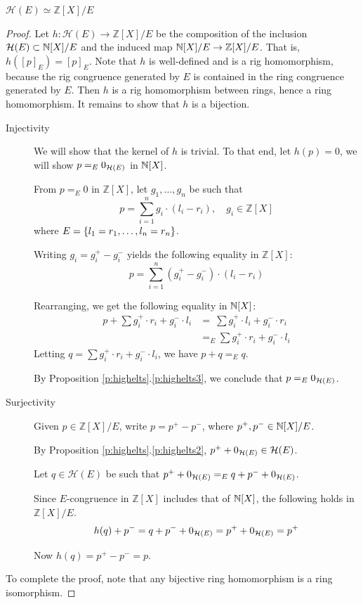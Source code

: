 \documentclass[numbers=enddot]{scrartcl}
\newcommand{\ints}{\mathbb{Z}}
\newcommand{\highring}{\mathcal{H}(E)}
\begin{document}
\begin{thm}
  $\highring \simeq \ints[X]/E$
\end{thm}
\begin{proof}
  Let $h : \highring \to \ints[X]/E$ be the composition of the inclusion $\highring \subset \nat[X]/E$ 
  and the induced map $\nat[X]/E \to \ints[X]/E$. That is, $h([p]_E) = [p]_E$. 
  Note that $h$ is well-defined and is a rig homomorphism, because the rig congruence generated by $E$ is contained in the ring congruence generated by $E$.
  Then $h$ is a rig homomorphism between rings, 
  hence a ring homomorphism. It remains to show that $h$ is a bijection.
  \begin{description}
    \item[Injectivity]
      We will show that the kernel of $h$ is trivial. To that end, let $h(p) = 0$, we will show 
      $p =_E \highzero$ in $\mathbb{N}[X]$.

      From $p =_E 0$ in $\ints[X]$, let $g_1,\dots,g_n$ be such that 
      \[ p = \sum_{i = 1}^n g_i \cdot (l_i - r_i), \quad g_i \in \ints[X] \] 
      where $E = \left\{l_1=r_1,\dots,l_n=r_n\right\}$.  

      Writing $g_i = g_i^+ - g_i^-$ yields the following equality in $\ints[X]$:
      \[ p = \sum_{i=1}^n (g_i^+-g_i^-)\cdot(l_i - r_i)\]

      Rearranging, we get the following equality in $\mathbb{N}[X]$:
      \begin{align*}
      p + \sum g_i^+ \cdot r_i + g_i^- \cdot l_i  
      &=\ \sum g_i^+ \cdot l_i + g_i^- \cdot r_i \\
      &=_E \sum g_i^+ \cdot r_i + g_i^- \cdot l_i
    \end{align*}
    Letting $q = \sum g_i^+ \cdot r_i + g_i^- \cdot l_i$, we have 
    $p + q =_E q$.

    By Proposition \ref{p:highelts}.\ref{p:highelts3}, we conclude that $p =_E \highzero$.
    \item[Surjectivity]
  Given $p \in \ints[X]/E$, write $p = p^+ - p^-$, where $p^+,p^- \in \mathbb{N}[X]/E$.


By Proposition \ref{p:highelts}.\ref{p:highelts2}, $p^+ + \highzero \in \highring$.

Let $q \in \highring$ be such that $p^+ + \highzero =_E q + p^- + \highzero$.

Since $E$-congruence in $\ints[X]$ includes that of $\mathbb{N}[X]$, the following holds in $\ints[X]/E$.
\[      h(q) + p^- 
      = q + p^- + \highzero
      = p^+ + \highzero 
    = p^+ \]

Now $h(q) = p^+ - p^- = p$.
\end{description}
To complete the proof, note that any bijective ring homomorphism is a ring isomorphism.
\end{proof}
\end{document}
